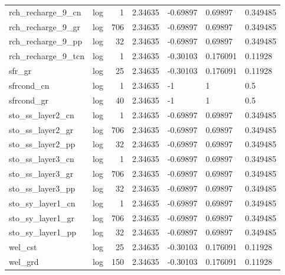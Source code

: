 \documentclass{article}
\begin{document}
\begin{center}
\begin{landscape}
\begin{longtable}{llrllll}
  rch\_recharge\_9\_cn &       log &      1 &        2.34635 &       -0.69897 &        0.69897 &           0.349485 \\
  rch\_recharge\_9\_gr &       log &    706 &        2.34635 &       -0.69897 &        0.69897 &           0.349485 \\
  rch\_recharge\_9\_pp &       log &     32 &        2.34635 &       -0.69897 &        0.69897 &           0.349485 \\
 rch\_recharge\_9\_tcn &       log &      1 &        2.34635 &       -0.30103 &       0.176091 &            0.11928 \\
             sfr\_gr &       log &     25 &        2.34635 &       -0.30103 &       0.176091 &            0.11928 \\
         sfrcond\_cn &       log &      1 &        2.34635 &             -1 &              1 &                0.5 \\
         sfrcond\_gr &       log &     40 &        2.34635 &             -1 &              1 &                0.5 \\
   sto\_ss\_layer2\_cn &       log &      1 &        2.34635 &       -0.69897 &        0.69897 &           0.349485 \\
   sto\_ss\_layer2\_gr &       log &    706 &        2.34635 &       -0.69897 &        0.69897 &           0.349485 \\
   sto\_ss\_layer2\_pp &       log &     32 &        2.34635 &       -0.69897 &        0.69897 &           0.349485 \\
   sto\_ss\_layer3\_cn &       log &      1 &        2.34635 &       -0.69897 &        0.69897 &           0.349485 \\
   sto\_ss\_layer3\_gr &       log &    706 &        2.34635 &       -0.69897 &        0.69897 &           0.349485 \\
   sto\_ss\_layer3\_pp &       log &     32 &        2.34635 &       -0.69897 &        0.69897 &           0.349485 \\
   sto\_sy\_layer1\_cn &       log &      1 &        2.34635 &       -0.69897 &        0.69897 &           0.349485 \\
   sto\_sy\_layer1\_gr &       log &    706 &        2.34635 &       -0.69897 &        0.69897 &           0.349485 \\
   sto\_sy\_layer1\_pp &       log &     32 &        2.34635 &       -0.69897 &        0.69897 &           0.349485 \\
            wel\_cst &       log &     25 &        2.34635 &       -0.30103 &       0.176091 &            0.11928 \\
            wel\_grd &       log &    150 &        2.34635 &       -0.30103 &       0.176091 &            0.11928 \\
\end{longtable}
\end{landscape}
\end{center}
\end{document}
